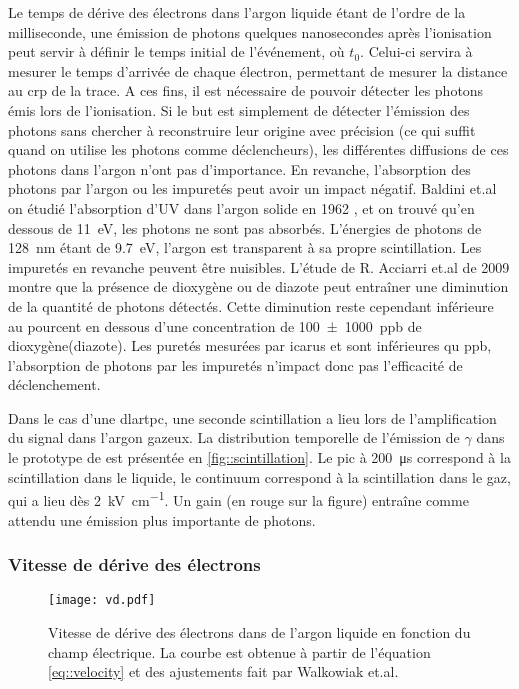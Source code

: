         Le temps de dérive des électrons dans l'argon liquide étant de l'ordre de la milliseconde, une émission de photons quelques nanosecondes après l'ionisation peut servir à définir le temps initial de l'événement, où $t_0$. Celui-ci servira à mesurer le temps d'arrivée de chaque électron, permettant de mesurer la distance au \gls{crp} de la trace. A ces fins, il est nécessaire de pouvoir détecter les photons émis lors de l'ionisation. Si le but est simplement de détecter l'émission des photons sans chercher à reconstruire leur origine avec précision (ce qui suffit quand on utilise les photons comme déclencheurs), les différentes diffusions de ces photons dans l'argon n'ont pas d'importance. En revanche, l'absorption des photons par l'argon ou les impuretés peut avoir un impact négatif. Baldini et.al on étudié l'absorption d'UV dans l'argon solide en 1962 \cite{Baldini1962}, et on trouvé qu'en dessous de \SI{11}{\eV}, les photons ne sont pas absorbés. L'énergies de photons de \SI{128}{\nano\meter} étant de \SI{9.7}{\eV}, l'argon est transparent à sa propre scintillation. Les impuretés en revanche peuvent être nuisibles. L'étude de R. Acciarri et.al de 2009\cite{Acciarri2009} montre que la présence de dioxygène ou de diazote peut entraîner une diminution de la quantité de photons détectés. Cette diminution reste cependant inférieure au pourcent en dessous d'une concentration de \SI{100(1000)}{ppb} de dioxygène(diazote). Les puretés mesurées par \gls{icarus}\cite{Antonello2014} et \protosp{} sont inférieures qu \si{ppb}, l'absorption de photons par les impuretés n'impact donc pas l'efficacité de déclenchement.

        Dans le cas d'une \gls{dlartpc}, une seconde scintillation a lieu lors de l'amplification du signal dans l'argon gazeux. La distribution temporelle de l'émission de $\gamma$ dans le prototype de \TOO{} est présentée en \autoref{fig::scintillation}. Le pic à \SI{200}{\micro\second} correspond à la scintillation dans le liquide, le continuum correspond à la scintillation dans le gaz, qui a lieu dès \SI{2}{\kilo\volt\per\centi\meter}. Un gain (en rouge sur la figure) entraîne comme attendu une émission plus importante de photons.

      \subsubsection{Vitesse de dérive des électrons}\label{sec::vitesse_derive}

        \begin{figure}[htbp]
          \centering
          \texttt{[image: vd.pdf]}
          \caption[Vitesse de dérive des électrons dans de l'argon liquide en fonction du champ électrique.]{\label{fig::velocity}Vitesse de dérive des électrons dans de l'argon liquide en fonction du champ électrique. La courbe est obtenue à partir de l'équation \eqref{eq::velocity} et des ajustements fait par Walkowiak et.al\cite{Walkowiak2000}.}
        \end{figure}

